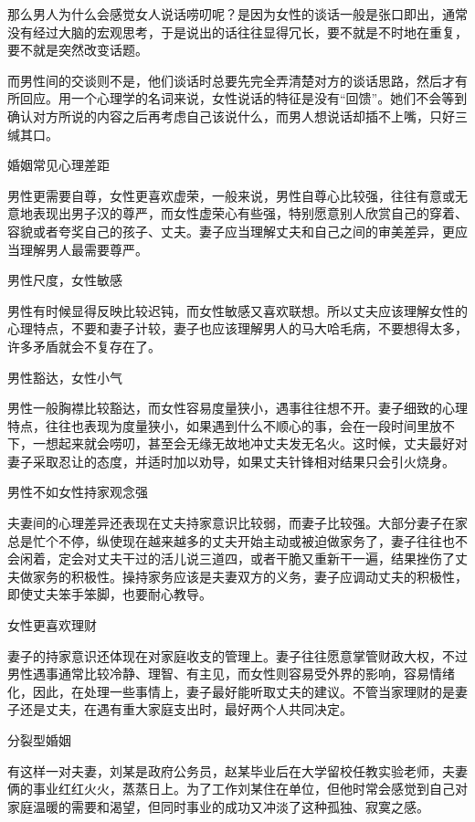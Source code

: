 \documentclass[12pt,UTF8,openany]{ctexbook}
\begin{document}
那么男人为什么会感觉女人说话唠叨呢？是因为女性的谈话一般是张口即出，通常没有经过大脑的宏观思考，于是说出的话往往显得冗长，要不就是不时地在重复，要不就是突然改变话题。

而男性间的交谈则不是，他们谈话时总要先完全弄清楚对方的谈话思路，然后才有所回应。用一个心理学的名词来说，女性说话的特征是没有“回馈”。她们不会等到确认对方所说的内容之后再考虑自己该说什么，而男人想说话却插不上嘴，只好三缄其口。





婚姻常见心理差距


男性更需要自尊，女性更喜欢虚荣，一般来说，男性自尊心比较强，往往有意或无意地表现出男子汉的尊严，而女性虚荣心有些强，特别愿意别人欣赏自己的穿着、容貌或者夸奖自己的孩子、丈夫。妻子应当理解丈夫和自己之间的审美差异，更应当理解男人最需要尊严。

男性尺度，女性敏感

男性有时候显得反映比较迟钝，而女性敏感又喜欢联想。所以丈夫应该理解女性的心理特点，不要和妻子计较，妻子也应该理解男人的马大哈毛病，不要想得太多，许多矛盾就会不复存在了。

男性豁达，女性小气

男性一般胸襟比较豁达，而女性容易度量狭小，遇事往往想不开。妻子细致的心理特点，往往也表现为度量狭小，如果遇到什么不顺心的事，会在一段时间里放不下，一想起来就会唠叨，甚至会无缘无故地冲丈夫发无名火。这时候，丈夫最好对妻子采取忍让的态度，并适时加以劝导，如果丈夫针锋相对结果只会引火烧身。

男性不如女性持家观念强

夫妻间的心理差异还表现在丈夫持家意识比较弱，而妻子比较强。大部分妻子在家总是忙个不停，纵使现在越来越多的丈夫开始主动或被迫做家务了，妻子往往也不会闲着，定会对丈夫干过的活儿说三道四，或者干脆又重新干一遍，结果挫伤了丈夫做家务的积极性。操持家务应该是夫妻双方的义务，妻子应调动丈夫的积极性，即使丈夫笨手笨脚，也要耐心教导。

女性更喜欢理财

妻子的持家意识还体现在对家庭收支的管理上。妻子往往愿意掌管财政大权，不过男性遇事通常比较冷静、理智、有主见，而女性则容易受外界的影响，容易情绪化，因此，在处理一些事情上，妻子最好能听取丈夫的建议。不管当家理财的是妻子还是丈夫，在遇有重大家庭支出时，最好两个人共同决定。





分裂型婚姻


有这样一对夫妻，刘某是政府公务员，赵某毕业后在大学留校任教实验老师，夫妻俩的事业红红火火，蒸蒸日上。为了工作刘某住在单位，但他时常会感觉到自己对家庭温暖的需要和渴望，但同时事业的成功又冲淡了这种孤独、寂寞之感。
\end{document}

